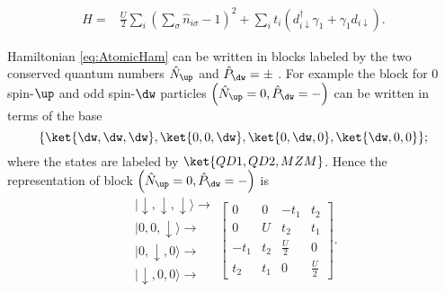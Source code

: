     \begin{eqnarray}
        H=  & \frac{U}{2}\sum_i(\sum_{\sigma} \hat{n}_{i\sigma}-1)^{2} +  \sum_{i} t_i \left(d_{i\downarrow}^{\dagger}\gamma_{1}+\gamma_{1}d_{i\downarrow}\right).
        \label{eq:AtomicHam}
    \end{eqnarray}


Hamiltonian \eqref{eq:AtomicHam} can be written in blocks labeled by the  two conserved quantum numbers $\hat{N}_\up $ and $\hat{P}_\dw = \pm$ . For example the block  for $0$ spin-$\up$  and odd spin-$\dw$ particles  $\left( \hat{N}_\up =0, \hat{P}_\dw = - \right)$ can be written in terms of the base 
    \begin{equation}
        \lbrace \ket{\dw,\dw,\dw} , \ket{0,0,\dw} , \ket{0,\dw,0}, \ket{\dw,0,0}     \rbrace;
    \end{equation}
where the states are labeled by  $\ket{QD1,QD2,MZM}$. Hence the representation of block     $\left( \hat{N}_\up =0, \hat{P}_\dw = - \right)$ is 
    \begin{equation}
    \begin{array}{c}
        \vert\downarrow,\downarrow,\downarrow\rangle\rightarrow\\
        \vert0,0,\downarrow\rangle\rightarrow\\
        \vert0,\downarrow,0\rangle\rightarrow\\
        \vert\downarrow,0,0\rangle\rightarrow
        \end{array}\left[\begin{array}{cccc}
        0 & 0 & -t_1 & t_2\\
        0 & U & t_2 & t_1\\
        -t_1 & t_2 & \frac{U}{2} & 0\\
        t_2 & t_1 & 0 & \frac{U}{2}
    \end{array}\right].
    \end{equation}

